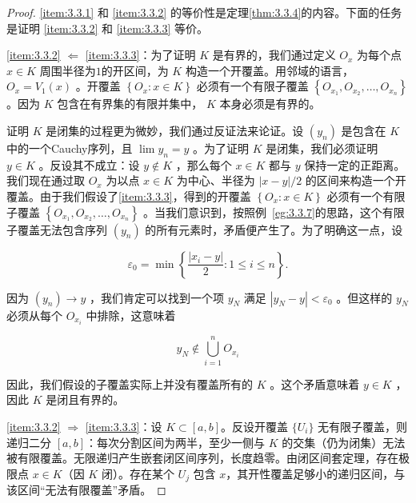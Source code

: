 \begin{proof}
  \ref{item:3.3.1} 和 \ref{item:3.3.2} 的等价性是定理\ref{thm:3.3.4}的内容。下面的任务是证明 \ref{item:3.3.2} 和 \ref{item:3.3.3} 等价。

  \ref{item:3.3.2} $\Leftarrow$ \ref{item:3.3.3}：为了证明 \(K\) 是有界的，我们通过定义 \({O}_{x}\) 为每个点 \(x \in  K\) 周围半径为$1$的开区间，为 \(K\) 构造一个开覆盖。用邻域的语言， \({O}_{x} = {V}_{1}\left( x\right)\) 。开覆盖 \(\left\{  {{O}_{x} : x \in  K}\right\}\) 必须有一个有限子覆盖 \(\left\{  {{O}_{{x}_{1}},{O}_{{x}_{2}},\ldots ,{O}_{{x}_{n}}}\right\}\) 。因为 \(K\) 包含在有界集的有限并集中， \(K\) 本身必须是有界的。

证明 \(K\) 是闭集的过程更为微妙，我们通过反证法来论证。设 \(\left( {y}_{n}\right)\) 是包含在 \(K\) 中的一个Cauchy序列，且 \(\lim {y}_{n} = y\) 。为了证明 \(K\) 是闭集，我们必须证明 \(y \in  K\) 。反设其不成立：设 \(y \notin  K\) ，那么每个 \(x \in  K\) 都与 \(y\) 保持一定的正距离。我们现在通过取 \({O}_{x}\) 为以点 \(x\in K\) 为中心、半径为 \(\left| {x - y}\right| /2\) 的区间来构造一个开覆盖。由于我们假设了\ref{item:3.3.3}，得到的开覆盖 \(\left\{  {{O}_{x} : x \in  K}\right\}\) 必须有一个有限子覆盖 \(\left\{  {{O}_{{x}_{1}},{O}_{{x}_{2}},\ldots ,{O}_{{x}_{n}}}\right\}\) 。当我们意识到，按照例~\ref{eg:3.3.7}的思路，这个有限子覆盖无法包含序列 \(\left( {y}_{n}\right)\) 的所有元素时，矛盾便产生了。为了明确这一点，设

\[
{\varepsilon }_{0} = \min \left\{  {\frac{\left| {x}_{i} - y\right| }{2} : 1 \leq  i \leq  n}\right\}  .
\]

因为 \(\left( {y}_{n}\right)  \rightarrow  y\) ，我们肯定可以找到一个项 \({y}_{N}\) 满足 \(\left| {{y}_{N} - y}\right|  < {\varepsilon }_{0}\) 。但这样的 \({y}_{N}\) 必须从每个 \({O}_{{x}_{i}}\) 中排除，这意味着

\[
{y}_{N} \notin  \mathop{\bigcup }\limits_{{i = 1}}^{n}{O}_{{x}_{i}}
\]

因此，我们假设的子覆盖实际上并没有覆盖所有的 \(K\) 。这个矛盾意味着 \(y \in  K\) ，因此 \(K\) 是闭且有界的。

\ref{item:3.3.2} $\Rightarrow$ \ref{item:3.3.3}：设 \(K \subset [a, b]\)。反设开覆盖 \(\{U_i\}\) 无有限子覆盖，则递归二分 \([a, b]\)：每次分割区间为两半，至少一侧与 \(K\) 的交集（仍为闭集）无法被有限覆盖。无限递归产生嵌套闭区间序列，长度趋零。由闭区间套定理，存在极限点 \(x \in K\)（因 \(K\) 闭）。存在某个 \(U_j\) 包含 \(x\)，其开性覆盖足够小的递归区间，与该区间“无法有限覆盖”矛盾。 
\end{proof}


